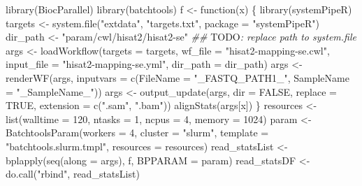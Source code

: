 \documentclass[14pt,]{article}
\newcommand{\hlnum}[1]{\textcolor[rgb]{0.816,0.125,0.439}{#1}}%
\newcommand{\hlstr}[1]{\textcolor[rgb]{0.251,0.627,0.251}{#1}}%
\newcommand{\hlcom}[1]{\textcolor[rgb]{0.502,0.502,0.502}{\textit{#1}}}%
\newcommand{\hlstd}[1]{\textcolor[rgb]{0.251,0.251,0.251}{#1}}%
\newcommand{\hlkwd}[1]{\textcolor[rgb]{0.878,0.439,0.125}{#1}}%
\newenvironment{Shaded}{\begin{myshaded}}{\end{myshaded}}
\newcommand{\DecValTok}[1]{\hlnum{#1}}
\newcommand{\ConstantTok}[1]{\hlnum{#1}}
\newcommand{\StringTok}[1]{\hlstr{#1}}
\newcommand{\DocumentationTok}[1]{\hlcom{#1}}
\newcommand{\OtherTok}[1]{{#1}}
\newcommand{\FunctionTok}[1]{\hlstd{#1}}
\newcommand{\ControlFlowTok}[1]{\hlkwd{#1}}
\newcommand{\AttributeTok}[1]{{#1}}
\newcommand{\AlertTok}[1]{\textcolor{errorcolor}{#1}}
\newcommand{\NormalTok}[1]{\hlstd{#1}}
\begin{document}
\begin{Shaded}
\begin{Highlighting}[]
\FunctionTok{library}\NormalTok{(BiocParallel)}
\FunctionTok{library}\NormalTok{(batchtools)}
\NormalTok{f }\OtherTok{\textless{}{-}} \ControlFlowTok{function}\NormalTok{(x) \{}
    \FunctionTok{library}\NormalTok{(systemPipeR)}
\NormalTok{    targets }\OtherTok{\textless{}{-}} \FunctionTok{system.file}\NormalTok{(}\StringTok{"extdata"}\NormalTok{, }\StringTok{"targets.txt"}\NormalTok{, }\AttributeTok{package =} \StringTok{"systemPipeR"}\NormalTok{)}
\NormalTok{    dir\_path }\OtherTok{\textless{}{-}} \StringTok{"param/cwl/hisat2/hisat2{-}se"}  \DocumentationTok{\#\# }\AlertTok{TODO}\DocumentationTok{: replace path to system.file }
\NormalTok{    args }\OtherTok{\textless{}{-}} \FunctionTok{loadWorkflow}\NormalTok{(}\AttributeTok{targets =}\NormalTok{ targets, }\AttributeTok{wf\_file =} \StringTok{"hisat2{-}mapping{-}se.cwl"}\NormalTok{, }\AttributeTok{input\_file =} \StringTok{"hisat2{-}mapping{-}se.yml"}\NormalTok{, }
        \AttributeTok{dir\_path =}\NormalTok{ dir\_path)}
\NormalTok{    args }\OtherTok{\textless{}{-}} \FunctionTok{renderWF}\NormalTok{(args, }\AttributeTok{inputvars =} \FunctionTok{c}\NormalTok{(}\AttributeTok{FileName =} \StringTok{"\_FASTQ\_PATH1\_"}\NormalTok{, }\AttributeTok{SampleName =} \StringTok{"\_SampleName\_"}\NormalTok{))}
\NormalTok{    args }\OtherTok{\textless{}{-}} \FunctionTok{output\_update}\NormalTok{(args, }\AttributeTok{dir =} \ConstantTok{FALSE}\NormalTok{, }\AttributeTok{replace =} \ConstantTok{TRUE}\NormalTok{, }\AttributeTok{extension =} \FunctionTok{c}\NormalTok{(}\StringTok{".sam"}\NormalTok{, }
        \StringTok{".bam"}\NormalTok{))}
    \FunctionTok{alignStats}\NormalTok{(args[x])}
\NormalTok{\}}
\NormalTok{resources }\OtherTok{\textless{}{-}} \FunctionTok{list}\NormalTok{(}\AttributeTok{walltime =} \DecValTok{120}\NormalTok{, }\AttributeTok{ntasks =} \DecValTok{1}\NormalTok{, }\AttributeTok{ncpus =} \DecValTok{4}\NormalTok{, }\AttributeTok{memory =} \DecValTok{1024}\NormalTok{)}
\NormalTok{param }\OtherTok{\textless{}{-}} \FunctionTok{BatchtoolsParam}\NormalTok{(}\AttributeTok{workers =} \DecValTok{4}\NormalTok{, }\AttributeTok{cluster =} \StringTok{"slurm"}\NormalTok{, }\AttributeTok{template =} \StringTok{"batchtools.slurm.tmpl"}\NormalTok{, }
    \AttributeTok{resources =}\NormalTok{ resources)}
\NormalTok{read\_statsList }\OtherTok{\textless{}{-}} \FunctionTok{bplapply}\NormalTok{(}\FunctionTok{seq}\NormalTok{(}\AttributeTok{along =}\NormalTok{ args), f, }\AttributeTok{BPPARAM =}\NormalTok{ param)}
\NormalTok{read\_statsDF }\OtherTok{\textless{}{-}} \FunctionTok{do.call}\NormalTok{(}\StringTok{"rbind"}\NormalTok{, read\_statsList)}
\end{Highlighting}
\end{Shaded}
\end{document}
